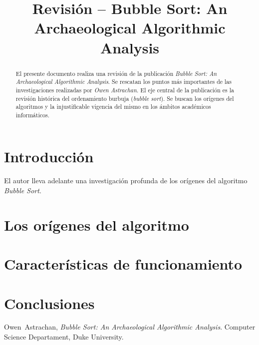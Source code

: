 \documentclass[conference]{IEEEtran}
\begin{document}
%
\title{Revisión -- Bubble Sort: An Archaeological Algorithmic Analysis}


\author{
}

\maketitle


\begin{abstract}
El presente documento realiza una revisión de la publicación
\emph{Bubble Sort: An Archaeological Algorithmic Analysis}. Se
rescatan los puntos más importantes de las investigaciones realizadas
por \emph{Owen Astrachan}. El eje central de la publicación es la
revisión histórica del ordenamiento burbuja (\emph{bubble
  sort}). Se buscan los orígenes del algoritmos y la injustificable
vigencia del mismo en los ámbitos académicos informáticos.
\end{abstract}

\IEEEpeerreviewmaketitle

\section{Introducción}
\label{sec:intro}

El autor lleva adelante una investigación profunda de los orígenes del
algoritmo \emph{Bubble Sort}. 

\section{Los orígenes del algoritmo}
\label{sec:origen-alg}

\section{Características de funcionamiento}
\label{sec:car-func}

\section{Conclusiones}
\label{sec:conc}


\begin{thebibliography}{1}
  Owen~Astrachan, \emph{Bubble Sort: An Archaeological Algorithmic
    Analysis}. Computer Science Departament, Duke University. 
\end{thebibliography}

\end{document}
